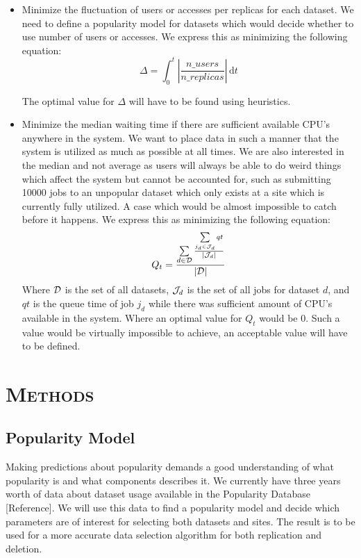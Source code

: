 \documentclass[11pt,a4page]{article}
\begin{document}
\begin{itemize}

  \item Minimize the fluctuation of users or accesses per replicas for each dataset. We need to define a popularity model for datasets which would decide whether to use number of users or accesses. We express this as minimizing the following equation:
		\begin{displaymath}
		  \Delta = \int_0^t \! \left|\frac{n\_users}{n\_replicas}\right| \, \mathrm{d}t
		\end{displaymath}

    The optimal value for $\Delta$ will have to be found using heuristics.

    \item Minimize the median waiting time if there are sufficient available CPU's anywhere in the system. We want to place data in such a manner that the system is utilized as much as possible at all times. We are also interested in the median and not average as users will always be able to do weird things which affect the system but cannot be accounted for, such as submitting 10000 jobs to an unpopular dataset which only exists at a site which is currently fully utilized. A case which would be almost impossible to catch before it happens. We express this as minimizing the following equation:
  \begin{displaymath}
    Q_t = \frac{\sum\limits_{d \in {\cal D}} \frac{\sum\limits_{j_d \in {\cal J}_d} qt}{|{\cal J}_d|}}{|{\cal D}|}
  \end{displaymath}
  Where ${\cal D}$ is the set of all datasets, ${\cal J}_d$ is the set of all jobs for dataset $d$, and $qt$ is the queue time of job $j_d$ while there was sufficient amount of CPU's available in the system. Where an optimal value for $Q_t$ would be $0$. Such a value would be virtually impossible to achieve, an acceptable value will have to be defined.

\end{itemize}


\section{\textsc{Methods}}

  \subsection{Popularity Model}
    Making predictions about popularity demands a good understanding of what popularity is and what components describes it. We currently have three years worth of data about dataset usage available in the Popularity Database [Reference]. We will use this data to find a popularity model and decide which parameters are of interest for selecting both datasets and sites. The result is to be used for a more accurate data selection algorithm for both replication and deletion.
\end{document}
